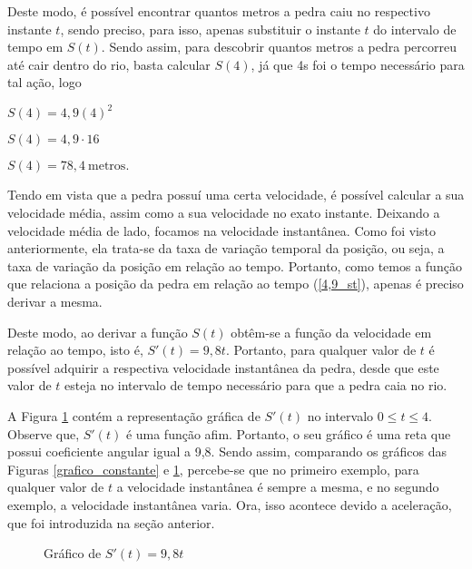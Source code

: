 \documentclass[
	12pt,				%
	openright,			%
    twoside,			%
	a4paper,			%
	chapter=TITLE,		%
	english,			%
	french,				%
	spanish,			%
	brazil				%
	]{abntex2}
\numberwithin{lema}{chapter}
\numberwithin{teorema}{chapter}
\numberwithin{definicao}{chapter}
\numberwithin{exemplo}{chapter}
\numberwithin{figure}{chapter}
\begin{document}
Deste modo, é possível encontrar quantos metros a pedra caiu no respectivo instante $t$, sendo preciso, para isso, apenas substituir o instante $t$ do intervalo de tempo em $S(t)$. Sendo assim, para descobrir quantos metros a pedra percorreu até cair dentro do rio, basta calcular $S(4)$, já que 4s foi o tempo necessário para tal ação, logo
\begin{center}
	$S(4) = 4,9(4)^{2}$
	
	$S(4) = 4,9 \cdot 16$
	
	$S(4) = 78,4 \ \text{metros}.$
\end{center}

Tendo em vista que a pedra possuí uma certa velocidade, é possível calcular a sua velocidade média, assim como a sua velocidade no exato instante. Deixando a velocidade média de lado, focamos na velocidade instantânea. Como foi visto anteriormente, ela trata-se da taxa de variação temporal da posição, ou seja, a taxa de variação da posição em relação ao tempo. Portanto, como temos a função que relaciona a posição da pedra em relação ao tempo (\ref{4,9_st}), apenas é preciso derivar a mesma.

Deste modo, ao derivar a função $S(t)$ obtêm-se a função da velocidade em relação ao tempo, isto é, $S'(t) = 9,8t$. Portanto, para qualquer valor de $t$ é possível adquirir a respectiva velocidade instantânea da pedra, desde que este valor de $t$ esteja no intervalo de tempo necessário para que a pedra caia no rio.

A Figura \ref{9,8t} contém a representação gráfica de $S'(t)$ no intervalo $0 \leq t \leq 4$. Observe que, $S'(t)$ é uma função afim. Portanto, o seu gráfico é uma reta que possui coeficiente angular igual a 9,8. Sendo assim, comparando os gráficos das Figuras \ref{grafico_constante} e \ref{9,8t}, percebe-se que no primeiro exemplo, para qualquer valor de $t$ a velocidade instantânea é sempre a mesma, e no segundo exemplo, a velocidade instantânea varia. Ora, isso acontece devido a aceleração, que foi introduzida na seção anterior.

\begin{figure}[!h]
	\centering
	\caption{Gráfico de $S'(t) = 9,8t$}
	\label{9,8t}
\end{figure}
\end{document}
